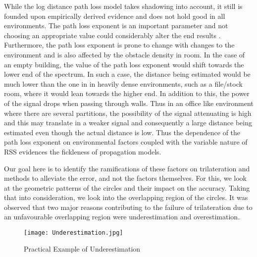 \documentclass[twocolumn, 11pt]{IEEEtran}
\begin{document}
While the log distance path loss model takes shadowing into account, it still is founded upon empirically derived evidence and does not hold good in all environments. The path loss exponent is an important parameter and not choosing an appropriate value could considerably alter the end results \cite{srinivasa2009path}. Furthermore, the path loss exponent is prone to change with changes to the environment and is also affected by the obstacle density in room. In the case of an empty building, the value of the path loss exponent would shift towards the lower end of the spectrum. In such a case, the distance being estimated would be much lower than the one in in heavily dense environments, such as a file/stock room, where it would lean towards the higher end. In addition to this, the power of the signal drops when passing through walls. Thus in an office like environment where there are several partitions, the possibility of the signal attenuating is high and this may translate in a weaker signal and consequently a large distance being estimated even though the actual distance is low. Thus the dependence of the path loss exponent on environmental factors coupled with the variable nature of RSS evidences the fickleness of propagation models. 

Our goal here is to identify the ramifications of these factors on trilateration and methods to alleviate the error, and not the factors themselves. For this, we look at the geometric patterns of the circles and their impact on the accuracy. Taking that into consideration, we look into the overlapping region of the circles. It was observed that two major reasons contributing to the failure of trilateration due to an unfavourable overlapping region were underestimation and overestimation. 

 

 \begin{figure}[ht!]
\centering
\texttt{[image: Underestimation.jpg]}
\caption{ Practical Example of Underestimation \label{overflow}}
\end{figure}
\end{document}

